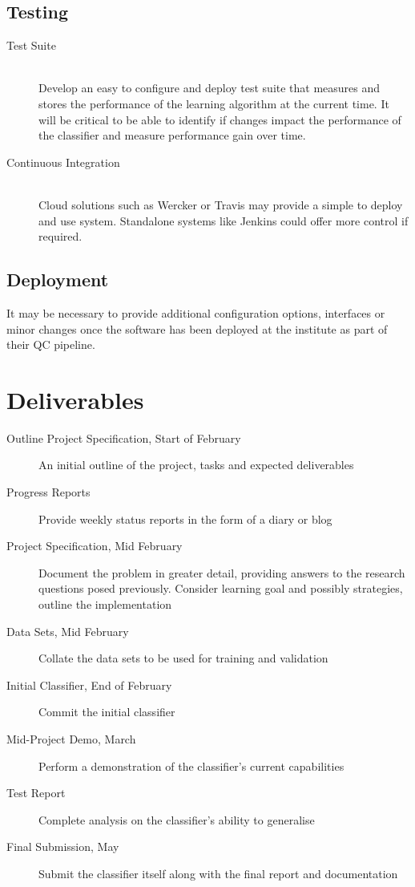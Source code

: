     \subsection{Testing}
        \begin{description}
            \item[Test Suite] \hfill \\
                Develop an easy to configure and deploy test suite that measures and stores the performance of the learning algorithm at the current time. It will be critical to be able to identify if changes impact the performance of the classifier and measure performance gain over time.
            \item[Continuous Integration] \hfill \\
                Cloud solutions such as Wercker or Travis may provide a simple to deploy and use system. Standalone systems like Jenkins could offer more control if required.
        \end{description}

    \subsection{Deployment}
        It may be necessary to provide additional configuration options, interfaces or minor changes once the software has been deployed at the institute as part of their QC pipeline.


\section{Deliverables}
    \begin{description}
        \item[Outline Project Specification, Start of February] An initial outline of the project, tasks and expected deliverables
        \item[Progress Reports] Provide weekly status reports in the form of a diary or blog
        \item[Project Specification, Mid February] Document the problem in greater detail, providing answers to the research questions posed previously. Consider learning goal and possibly strategies, outline the implementation
        \item[Data Sets, Mid February] Collate the data sets to be used for training and validation
        \item[Initial Classifier, End of February] Commit the initial classifier
        \item[Mid-Project Demo, March] Perform a demonstration of the classifier's current capabilities
        \item[Test Report] Complete analysis on the classifier's ability to generalise
        \item[Final Submission, May] Submit the classifier itself along with the final report and documentation
    \end{description}

